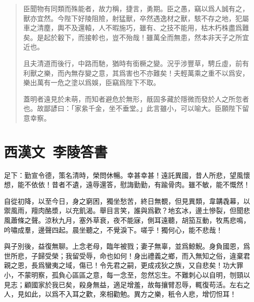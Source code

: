 \begin{quotation}
臣聞物有同類而殊能者，故力稱，捷言，勇期。臣之愚，竊以爲人誠有之，獸亦宜然。今陛下好陵阻險，射猛獸，卒然遇逸材之獸，駭不存之地，犯屬車之清塵，輿不及還轅，人不暇施巧，雖有、之技不能用，枯木朽株盡爲難矣。是起於轂下，而接軫也，豈不殆哉！雖萬全而無患，然本非天子之所宜近也。

且夫清道而後行，中路而馳，猶時有銜橛之變。況乎涉豐草，騁丘虛，前有利獸之樂，而內無存變之意，其爲害也不亦難矣！夫輕萬乘之重不以爲安，樂出萬有一危之塗以爲娛，臣竊爲陛下不取。

蓋明者遠見於未萌，而知者避危於無形，旤固多藏於隱微而發於人之所忽者也。故鄙諺曰：「家絫千金，坐不垂堂。」此言雖小，可以喻大。臣願陛下留意幸察。
\end{quotation}
\vspace{-1em}
\theendnotes

\section[李陵答蘇武書\quad{\small 西漢文}]{{\normalsize 西漢文\ 李陵}\quad 答書}
足下：勤宣令德，策名清時，榮問休暢。幸甚幸甚！遠託異國，昔人所悲，望風懷想，能不依依！昔者不遺，遠辱還答，慰誨勤勤，有踰骨肉。雖不敏，能不慨然！

自從初降，以至今日，身之窮困，獨坐愁苦，終日無覩，但見異類，韋韝毳幕，以禦風雨，羶肉酪漿，以充飢渴。舉目言笑，誰與爲歡？地玄冰，邊土慘裂，但聞悲風蕭條之聲。涼秋九月，塞外草衰，夜不能寐，側耳遠聽，胡笳互動，牧馬悲鳴，吟嘯成羣，邊聲四起。晨坐聽之，不覺淚下。嗟乎！獨何心，能不悲哉！

與子別後，益復無聊。上念老母，臨年被戮；妻子無辜，並爲鯨鯢。身負國恩，爲世所悲，子歸受榮；我留受辱，命也如何！身出禮義之鄉，而入無知之俗，違棄君親之恩，長爲蠻夷之域，傷已！令先君之嗣，更成戎狄之族，又自悲矣！功大罪小，不蒙明察，孤負心區區之意，每一念至，忽然忘生。不難刺心以自明，刎頸以見志；顧國家於我已矣，殺身無益，適足增羞，故每攘臂忍辱，輒復苟活。左右之人，見如此，以爲不入耳之歡，來相勸勉。異方之樂，秖令人悲，增忉怛耳！

